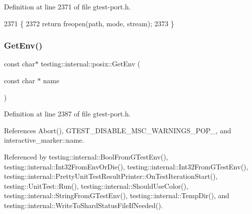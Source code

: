 Definition at line 2371 of file gtest-\/port.\+h.


\begin{DoxyCode}
2371                                                                        \{
2372   \textcolor{keywordflow}{return} freopen(path, mode, stream);
2373 \}
\end{DoxyCode}
\mbox{\label{namespacetesting_1_1internal_1_1posix_a1d5e3da5a27eed25986859fa83cafe95}} 
\subsubsection{\texorpdfstring{Get\+Env()}{GetEnv()}}
{\footnotesize\ttfamily const char$\ast$ testing\+::internal\+::posix\+::\+Get\+Env (\begin{DoxyParamCaption}\item[{const char $\ast$}]{name }\end{DoxyParamCaption})\hspace{0.3cm}{\ttfamily [inline]}}



Definition at line 2387 of file gtest-\/port.\+h.



References Abort(), G\+T\+E\+S\+T\+\_\+\+D\+I\+S\+A\+B\+L\+E\+\_\+\+M\+S\+C\+\_\+\+W\+A\+R\+N\+I\+N\+G\+S\+\_\+\+P\+O\+P\+\_\+, and interactive\+\_\+marker\+::name.



Referenced by testing\+::internal\+::\+Bool\+From\+G\+Test\+Env(), testing\+::internal\+::\+Int32\+From\+Env\+Or\+Die(), testing\+::internal\+::\+Int32\+From\+G\+Test\+Env(), testing\+::internal\+::\+Pretty\+Unit\+Test\+Result\+Printer\+::\+On\+Test\+Iteration\+Start(), testing\+::\+Unit\+Test\+::\+Run(), testing\+::internal\+::\+Should\+Use\+Color(), testing\+::internal\+::\+String\+From\+G\+Test\+Env(), testing\+::internal\+::\+Temp\+Dir(), and testing\+::internal\+::\+Write\+To\+Shard\+Status\+File\+If\+Needed().


